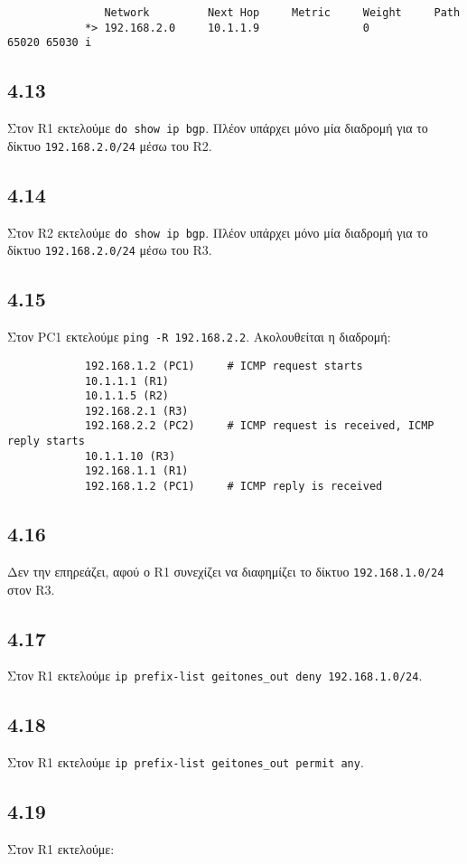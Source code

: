 \documentclass[a4paper, 12pt]{article}
\begin{document}
		\begin{verbatim}
			   Network         Next Hop     Metric     Weight     Path
			*> 192.168.2.0     10.1.1.9                0          65020 65030 i
		\end{verbatim}

	\subsection*{4.13}
		Στον R1 εκτελούμε \verb|do show ip bgp|. Πλέον υπάρχει μόνο μία διαδρομή για το δίκτυο \verb|192.168.2.0/24| μέσω του R2.

	\subsection*{4.14}
		Στον R2 εκτελούμε \verb|do show ip bgp|. Πλέον υπάρχει μόνο μία διαδρομή για το δίκτυο \verb|192.168.2.0/24| μέσω του R3.

	\subsection*{4.15}
		Στον PC1 εκτελούμε \verb|ping -R 192.168.2.2|. Ακολουθείται η διαδρομή:
		
		\begin{verbatim}
			192.168.1.2 (PC1)     # ICMP request starts
			10.1.1.1 (R1)
			10.1.1.5 (R2)
			192.168.2.1 (R3)
			192.168.2.2 (PC2)     # ICMP request is received, ICMP reply starts
			10.1.1.10 (R3)
			192.168.1.1 (R1)
			192.168.1.2 (PC1)     # ICMP reply is received
		\end{verbatim} 

	\subsection*{4.16}
		Δεν την επηρεάζει, αφού ο R1 συνεχίζει να διαφημίζει το δίκτυο \verb|192.168.1.0/24| στον R3.

	\subsection*{4.17}
		Στον R1 εκτελούμε \verb|ip prefix-list geitones_out deny 192.168.1.0/24|.

	\subsection*{4.18}
		Στον R1 εκτελούμε \verb|ip prefix-list geitones_out permit any|.

	\subsection*{4.19}
		Στον R1 εκτελούμε:
			
\end{document}
